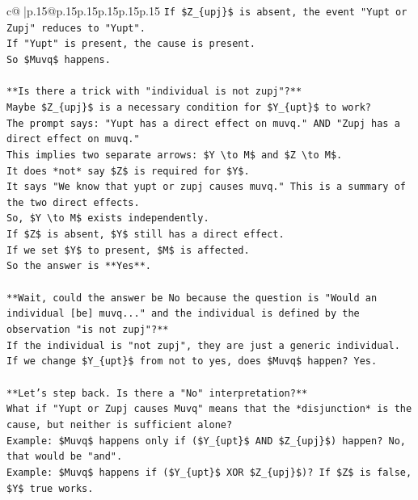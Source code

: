 \documentclass{article}
\begin{document}
{\begin{supertabular}{c@{$\;$}|p{.15\linewidth}@{}p{.15\linewidth}p{.15\linewidth}p{.15\linewidth}p{.15\linewidth}p{.15\linewidth}}
{{{\texttt{If \$Z\_\{upj\}\$ is absent, the event "Yupt or Zupj" reduces to "Yupt".} \\
\texttt{If "Yupt" is present, the cause is present.} \\
\texttt{So \$Muvq\$ happens.} \\
\\ 
\texttt{**Is there a trick with "individual is not zupj"?**} \\
\texttt{Maybe \$Z\_\{upj\}\$ is a necessary condition for \$Y\_\{upt\}\$ to work?} \\
\texttt{The prompt says: "Yupt has a direct effect on muvq." AND "Zupj has a direct effect on muvq."} \\
\texttt{This implies two separate arrows: \$Y \textbackslash{}to M\$ and \$Z \textbackslash{}to M\$.} \\
\texttt{It does *not* say \$Z\$ is required for \$Y\$.} \\
\texttt{It says "We know that yupt or zupj causes muvq." This is a summary of the two direct effects.} \\
\texttt{So, \$Y \textbackslash{}to M\$ exists independently.} \\
\texttt{If \$Z\$ is absent, \$Y\$ still has a direct effect.} \\
\texttt{If we set \$Y\$ to present, \$M\$ is affected.} \\
\texttt{So the answer is **Yes**.} \\
\\ 
\texttt{**Wait, could the answer be No because the question is "Would an individual {[}be{]} muvq..." and the individual is defined by the observation "is not zupj"?**} \\
\texttt{If the individual is "not zupj", they are just a generic individual.} \\
\texttt{If we change \$Y\_\{upt\}\$ from not to yes, does \$Muvq\$ happen? Yes.} \\
\\ 
\texttt{**Let's step back. Is there a "No" interpretation?**} \\
\texttt{What if "Yupt or Zupj causes Muvq" means that the *disjunction* is the cause, but neither is sufficient alone?} \\
\texttt{Example: \$Muvq\$ happens only if (\$Y\_\{upt\}\$ AND \$Z\_\{upj\}\$) happen? No, that would be "and".} \\
\texttt{Example: \$Muvq\$ happens if (\$Y\_\{upt\}\$ XOR \$Z\_\{upj\}\$)? If \$Z\$ is false, \$Y\$ true works.} \\
}}}
\end{supertabular}}
\end{document}

